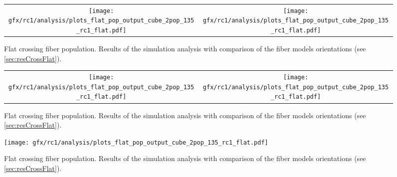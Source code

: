 %
\begin{sidewaysfigure}[!p]
    \centering
    \begin{tabular}{cc}
    \texttt{[image: gfx/rc1/analysis/plots\_flat\_pop\_output\_cube\_2pop\_135\_rc1\_flat.pdf]} &
    \texttt{[image: gfx/rc1/analysis/plots\_flat\_pop\_output\_cube\_2pop\_135\_rc1\_flat.pdf]}
    \end{tabular}
    \caption{Flat crossing fiber population. Results of the simulation analysis with comparison of the fiber models orientations (see \cref{sec:resCrossFlat}).}
    \label{app:flat_fiber_pop_c}
\end{sidewaysfigure}
%
\begin{sidewaysfigure}[!p]
    \centering
    \begin{tabular}{cc}
    \texttt{[image: gfx/rc1/analysis/plots\_flat\_pop\_output\_cube\_2pop\_135\_rc1\_flat.pdf]} &
    \texttt{[image: gfx/rc1/analysis/plots\_flat\_pop\_output\_cube\_2pop\_135\_rc1\_flat.pdf]}
    \end{tabular}
    \caption{Flat crossing fiber population. Results of the simulation analysis with comparison of the fiber models orientations (see \cref{sec:resCrossFlat}).}
    \label{app:flat_fiber_pop_d}
\end{sidewaysfigure}
%
\begin{figure}[!p]
    \centering
    \texttt{[image: gfx/rc1/analysis/plots\_flat\_pop\_output\_cube\_2pop\_135\_rc1\_flat.pdf]}
    \caption{Flat crossing fiber population. Results of the simulation analysis with comparison of the fiber models orientations (see \cref{sec:resCrossFlat}).}
    \label{app:flat_fiber_pop_e}
\end{figure}
%
%
%
%
